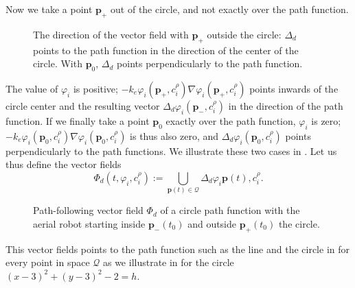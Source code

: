 Now we take a point $\mathbf{p}_{+}$ out of the circle, and not exactly over the path function. 
\begin{figure}[h!]
  \centering
  \selectfont
  
  \caption[The direction of the vector field outside and on the path function]{The direction of the vector field with $\mathbf{p}_{+}$ outside the circle: $\Delta_d$ points to the path function in the direction of the center of the circle. With $\mathbf{p}_{0}$, $\Delta_d$ points perpendicularly to the path function.}
  \label{fig:grad_gvf2}
\end{figure}
The value of $\varphi_i$ is positive; $-k_e\varphi_i(\mathbf{p}_{+},c_i^\rho)\nabla\varphi_i(\mathbf{p}_{+},c_i^\rho)$ points inwards of the circle center and the resulting vector $\Delta_d\varphi_i(\mathbf{p}_{-},c_i^\rho)$ in the direction of the path function. If we finally take a point $\mathbf{p}_{0}$ exactly over the path function, $\varphi_i$ is zero; $-k_e\varphi_i(\mathbf{p}_{0},c_i^\rho)\nabla\varphi_i(\mathbf{p}_{0},c_i^\rho)$ is thus also zero, and $\Delta_d\varphi_i(\mathbf{p}_{0},c_i^\rho)$ points perpendicularly to the path functions. We illustrate these two cases in . Let us thus define the vector fields
\begin{equation}
  \varPhi_d(t,\varphi_i,c_i^\rho):=\bigcup\limits_{\mathbf{p}(t)\in\mathcal{Q}}{\Delta_d\varphi_i{\mathbf{p}(t),c_i^\rho}}.
\end{equation}

\begin{figure}[h!]
  \centering
  \selectfont
  
  \caption[Path-following vector field of a circle path function.]{Path-following vector field $\varPhi_d$ of a circle path function with the aerial robot starting inside $\mathbf{p}_{-}(t_0)$ and outside $\mathbf{p}_{+}(t_0)$ the circle.}
  \label{fig:vecfs}
\end{figure}
This vector fields points to the path function such as the line and the circle in  for every point in space $\mathcal{Q}$ as we illustrate in  for the circle $(x-3)^2+(y-3)^2-2=h$.


